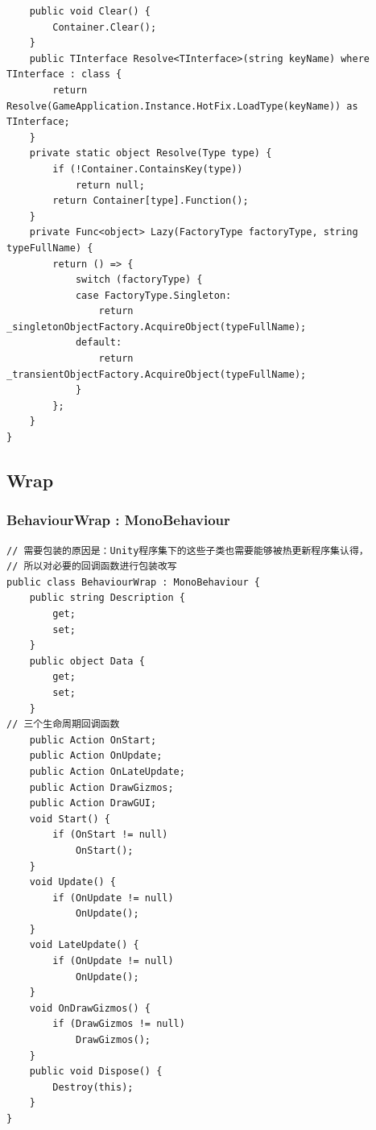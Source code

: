 \documentclass[9pt, b5paper]{article}
\begin{document}
\begin{verbatim}
    public void Clear() {
        Container.Clear();
    }
    public TInterface Resolve<TInterface>(string keyName) where TInterface : class {
        return Resolve(GameApplication.Instance.HotFix.LoadType(keyName)) as TInterface;
    }
    private static object Resolve(Type type) {
        if (!Container.ContainsKey(type)) 
            return null;
        return Container[type].Function();
    }
    private Func<object> Lazy(FactoryType factoryType, string typeFullName) {
        return () => {
            switch (factoryType) {
            case FactoryType.Singleton:
                return _singletonObjectFactory.AcquireObject(typeFullName);
            default:
                return _transientObjectFactory.AcquireObject(typeFullName);
            }
        };
    }
}
\end{verbatim}
\subsection{Wrap}
\label{sec-5-4}
\subsubsection{BehaviourWrap : MonoBehaviour}
\label{sec-5-4-1}
\begin{verbatim}
// 需要包装的原因是：Unity程序集下的这些子类也需要能够被热更新程序集认得，
// 所以对必要的回调函数进行包装改写
public class BehaviourWrap : MonoBehaviour {
    public string Description {
        get;
        set;
    }
    public object Data {
        get;
        set;
    }
// 三个生命周期回调函数
    public Action OnStart;
    public Action OnUpdate;
    public Action OnLateUpdate;
    public Action DrawGizmos;
    public Action DrawGUI;
    void Start() {
        if (OnStart != null) 
            OnStart();
    }
    void Update() {
        if (OnUpdate != null) 
            OnUpdate();
    }
    void LateUpdate() {
        if (OnUpdate != null) 
            OnUpdate();
    }
    void OnDrawGizmos() {
        if (DrawGizmos != null) 
            DrawGizmos();
    }
    public void Dispose() {
        Destroy(this);
    }
}
\end{verbatim}
\end{document}
